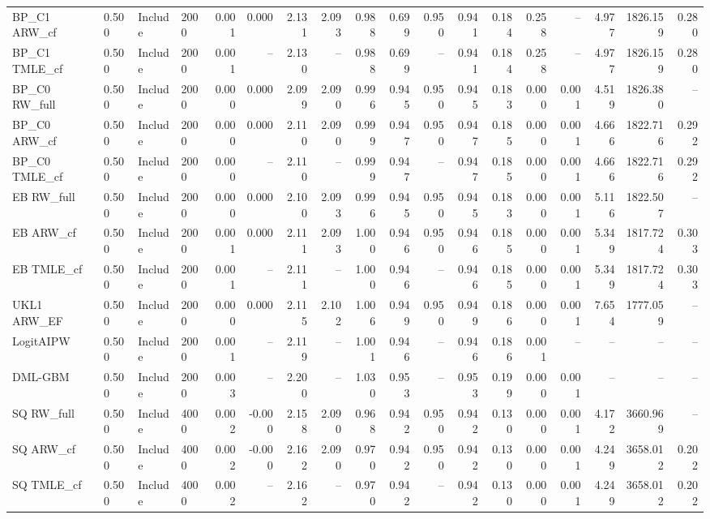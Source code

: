 \begin{tabular}{llllrrrrrrrrrrrrrr}
BP\_C1 ARW\_cf & 0.500 & Include & 2000 & 0.001 & 0.000 & 2.131 & 2.093 & 0.988 & 0.699 & 0.950 & 0.941 & 0.184 & 0.258 & -- & 4.977 & 1826.159 & 0.280 \\
BP\_C1 TMLE\_cf & 0.500 & Include & 2000 & 0.001 & -- & 2.130 & -- & 0.988 & 0.699 & -- & 0.941 & 0.184 & 0.258 & -- & 4.977 & 1826.159 & 0.280 \\
BP\_C0 RW\_full & 0.500 & Include & 2000 & 0.000 & 0.000 & 2.099 & 2.090 & 0.996 & 0.945 & 0.950 & 0.945 & 0.183 & 0.000 & 0.001 & 4.519 & 1826.380 & -- \\
BP\_C0 ARW\_cf & 0.500 & Include & 2000 & 0.000 & 0.000 & 2.110 & 2.090 & 0.999 & 0.947 & 0.950 & 0.947 & 0.185 & 0.000 & 0.001 & 4.666 & 1822.716 & 0.292 \\
BP\_C0 TMLE\_cf & 0.500 & Include & 2000 & 0.000 & -- & 2.110 & -- & 0.999 & 0.947 & -- & 0.947 & 0.185 & 0.000 & 0.001 & 4.666 & 1822.716 & 0.292 \\
EB RW\_full & 0.500 & Include & 2000 & 0.000 & 0.000 & 2.100 & 2.093 & 0.996 & 0.945 & 0.950 & 0.945 & 0.183 & 0.000 & 0.001 & 5.116 & 1822.507 & -- \\
EB ARW\_cf & 0.500 & Include & 2000 & 0.001 & 0.000 & 2.111 & 2.093 & 1.000 & 0.946 & 0.950 & 0.946 & 0.185 & 0.000 & 0.001 & 5.349 & 1817.724 & 0.303 \\
EB TMLE\_cf & 0.500 & Include & 2000 & 0.001 & -- & 2.111 & -- & 1.000 & 0.946 & -- & 0.946 & 0.185 & 0.000 & 0.001 & 5.349 & 1817.724 & 0.303 \\
UKL1 ARW\_EF & 0.500 & Include & 2000 & 0.000 & 0.000 & 2.115 & 2.102 & 1.006 & 0.949 & 0.950 & 0.949 & 0.186 & 0.000 & 0.001 & 7.654 & 1777.059 & -- \\
LogitAIPW & 0.500 & Include & 2000 & 0.001 & -- & 2.119 & -- & 1.001 & 0.946 & -- & 0.946 & 0.186 & 0.001 & -- & -- & -- & -- \\
DML-GBM & 0.500 & Include & 2000 & 0.003 & -- & 2.200 & -- & 1.030 & 0.953 & -- & 0.953 & 0.199 & 0.000 & 0.001 & -- & -- & -- \\
SQ RW\_full & 0.500 & Include & 4000 & 0.002 & -0.000 & 2.158 & 2.090 & 0.968 & 0.942 & 0.950 & 0.942 & 0.130 & 0.000 & 0.001 & 4.172 & 3660.969 & -- \\
SQ ARW\_cf & 0.500 & Include & 4000 & 0.002 & -0.000 & 2.162 & 2.090 & 0.970 & 0.942 & 0.950 & 0.942 & 0.130 & 0.000 & 0.001 & 4.249 & 3658.012 & 0.202 \\
SQ TMLE\_cf & 0.500 & Include & 4000 & 0.002 & -- & 2.162 & -- & 0.970 & 0.942 & -- & 0.942 & 0.130 & 0.000 & 0.001 & 4.249 & 3658.012 & 0.202 \\

\end{tabular}
